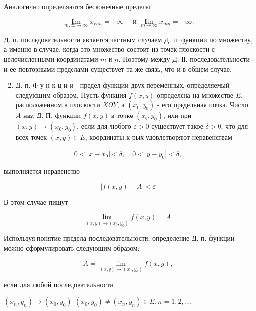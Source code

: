 \documentclass[10pt]{article}
\begin{document}
Аналогично определяются бесконечные пределы



\[

\lim _{m, \infty \rightarrow \infty} x_{r n n}=+\infty \quad \text { и } \lim _{m \rightarrow \infty} x_{m n}=-\infty .

\]



Д. п. последовательности является частным случаем Д. п. функции по множеству, а именно в случае, когда это множество состоит из точек плоскости с целочисленными координатами $m$ и $n$. Поэтому между Д. ІІ. последовательности и ее повторными пределами существует та же связь, что и в общем случае.



\begin{enumerate}

  \setcounter{enumi}{1}

  \item Д. п. Ф у н к ц и и - предел функции двух переменных, определяемый следующим образом. Пусть функция $f(x, y)$ определена на множестве $E$, расположенном в плоскости $X O Y$, а $\left(x_{0}, y_{0}\right)$ - его предельная почка. Число $A$ наз. Д. П. функции $f(x, y)$ в точке $\left(x_{0}, y_{0}\right)$, или при $(x, y) \rightarrow\left(x_{0}, y_{0}\right)$, если для любого $\varepsilon>0$ существует такое $\delta>0$, что для всех точек $(x, y) \in E$, координаты к-рых удовлетворяют неравенствам

\end{enumerate}



\[

0<\left|x-x_{0}\right|<\delta, \quad 0<\left|y-y_{0}\right|<\delta,

\]



выполняется неравенство



\[

|f(x, y)-A|<\varepsilon

\]



В этом случае пишут



\[

\lim _{(x, y) \rightarrow\left(x_{0}, y_{0}\right)} f(x, y)=A .

\]



Используя понятие предела последовательности, определение Д. п. функции можно сформулировать следующим образом:



\[

A=\lim _{(x, y) \rightarrow\left(x_{0}, y_{0}\right)} f(x, y),

\]



если для любой последовательности



$\left(x_{n}, y_{n}\right) \longrightarrow\left(x_{0}, y_{0}\right),\left(x_{0}, y_{0}\right) \neq\left(x_{n}, y_{n}\right) \in E, n=1,2, \ldots$,
\end{document}
